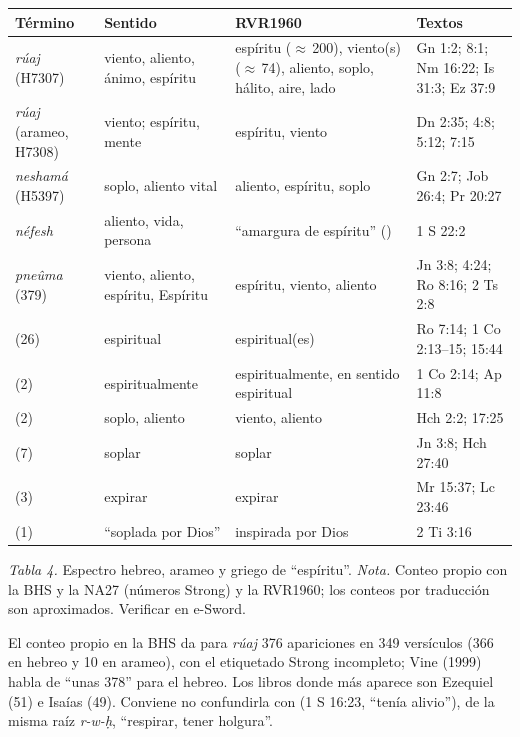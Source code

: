 \begin{center}\small\renewcommand{\arraystretch}{1.18}
\begin{tabular}{@{}L{3.3cm}L{3.3cm}L{4.0cm}L{3.6cm}@{}}
\toprule
\textbf{Término} & \textbf{Sentido} & \textbf{RVR1960} & \textbf{Textos} \\ \midrule
{} \emph{rúaj} (H7307) & viento, aliento, ánimo, espíritu & espíritu ($\approx$\,200), viento(s) ($\approx$\,74), aliento, soplo, hálito, aire, lado & Gn 1:2; 8:1; Nm 16:22; Is 31:3; Ez 37:9 \\
 \emph{rúaj} (arameo, H7308) & viento; espíritu, mente & espíritu, viento & Dn 2:35; 4:8; 5:12; 7:15 \\
 \emph{neshamá} (H5397) & soplo, aliento vital & aliento, espíritu, soplo & Gn 2:7; Job 26:4; Pr 20:27 \\
 \emph{néfesh} & aliento, vida, persona & ``amargura de espíritu'' () & 1 S 22:2 \\ \midrule
{} \emph{pneûma} (379) & viento, aliento, espíritu, Espíritu & espíritu, viento, aliento & Jn 3:8; 4:24; Ro 8:16; 2 Ts 2:8 \\
 (26) & espiritual & espiritual(es) & Ro 7:14; 1 Co 2:13--15; 15:44 \\
 (2) & espiritualmente & espiritualmente, en sentido espiritual & 1 Co 2:14; Ap 11:8 \\
 (2) & soplo, aliento & viento, aliento & Hch 2:2; 17:25 \\
 (7) & soplar & soplar & Jn 3:8; Hch 27:40 \\
 (3) & expirar & expirar & Mr 15:37; Lc 23:46 \\
 (1) & ``soplada por Dios'' & inspirada por Dios & 2 Ti 3:16 \\
\bottomrule
\end{tabular}\par
{\footnotesize\color{gris}\textit{Tabla 4.} Espectro hebreo, arameo y griego de ``espíritu''. \textit{Nota.} Conteo propio con la BHS y la NA27 (números Strong) y la RVR1960; los conteos por traducción son aproximados. Verificar en e-Sword.}
\end{center}

El conteo propio en la BHS da para \emph{rúaj} 376 apariciones en 349 versículos (366 en hebreo y 10 en arameo), con el etiquetado Strong incompleto; Vine (1999) habla de ``unas 378'' para el hebreo. Los libros donde más aparece son Ezequiel (51) e Isaías (49). Conviene no confundirla con  (1 S 16:23, ``tenía alivio''), de la misma raíz \emph{r-w-ḥ}, ``respirar, tener holgura''.


